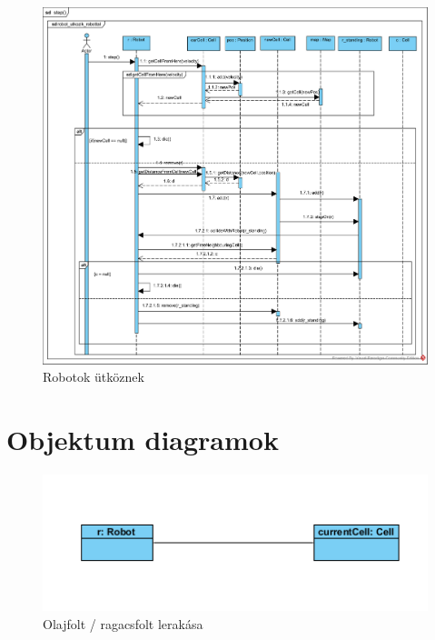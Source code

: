 \clearpage


\begin{figure}[!htbp]
	\begin{center}
		\includegraphics[width=18cm]{./chapters/chapter05/robot_collide_robot.png}
		\caption{Robotok ütköznek}

	\end{center}
\end{figure}

\clearpage

\section{Objektum diagramok}

\begin{figure}[!htbp]
	\begin{center}
		\includegraphics[width=13cm]{./chapters/chapter05/placetrapobject.png}
		\caption{Olajfolt / ragacsfolt lerakása}
	\end{center}
\end{figure}


